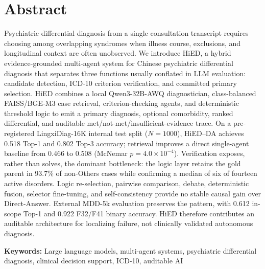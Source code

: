 
\chapter*{Abstract}
Psychiatric differential diagnosis from a single consultation transcript requires choosing among overlapping syndromes when illness course, exclusions, and longitudinal context are often unobserved. We introduce HiED, a hybrid evidence-grounded multi-agent system for Chinese psychiatric differential diagnosis that separates three functions usually conflated in LLM evaluation: candidate detection, ICD-10 criterion verification, and committed primary selection. HiED combines a local Qwen3-32B-AWQ diagnostician, class-balanced FAISS/BGE-M3 case retrieval, criterion-checking agents, and deterministic threshold logic to emit a primary diagnosis, optional comorbidity, ranked differential, and auditable met/not-met/insufficient-evidence trace. On a pre-registered LingxiDiag-16K internal test split ($N=1000$), HiED--DA achieves 0.518 Top-1 and 0.802 Top-3 accuracy; retrieval improves a direct single-agent baseline from 0.466 to 0.508 (McNemar $p=4.0\times10^{-4}$). Verification exposes, rather than solves, the dominant bottleneck: the logic layer retains the gold parent in 93.7\% of non-Others cases while confirming a median of six of fourteen active disorders. Logic re-selection, pairwise comparison, debate, deterministic fusion, selector fine-tuning, and self-consistency provide no stable causal gain over Direct-Answer. External MDD-5k evaluation preserves the pattern, with 0.612 in-scope Top-1 and 0.922 F32/F41 binary accuracy. HiED therefore contributes an auditable architecture for localizing failure, not clinically validated autonomous diagnosis.

\noindent\textbf{Keywords:} Large language models, multi-agent systems, psychiatric differential diagnosis, clinical decision support, ICD-10, auditable AI
